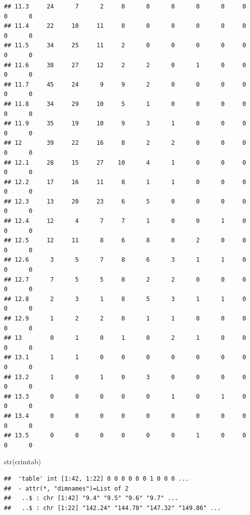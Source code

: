 \documentclass[
]{article}
\newenvironment{Shaded}{\begin{snugshade}}{\end{snugshade}}
\newcommand{\FunctionTok}[1]{\textcolor[rgb]{0.00,0.00,0.00}{#1}}
\newcommand{\NormalTok}[1]{#1}
\begin{document}
\begin{verbatim}
## 11.3     24      7      2     0      0      0      0      0     0      0      0
## 11.4     22     10     11     0      0      0      0      0     0      0      0
## 11.5     34     25     11     2      0      0      0      0     0      0      0
## 11.6     38     27     12     2      2      0      1      0     0      0      0
## 11.7     45     24      9     9      2      0      0      0     0      0      0
## 11.8     34     29     10     5      1      0      0      0     0      0      0
## 11.9     35     19     10     9      3      1      0      0     0      0      0
## 12       39     22     16     8      2      2      0      0     0      0      0
## 12.1     28     15     27    10      4      1      0      0     0      0      0
## 12.2     17     16     11     8      1      1      0      0     0      0      0
## 12.3     13     20     23     6      5      0      0      0     0      0      0
## 12.4     12      4      7     7      1      0      0      1     0      0      0
## 12.5     12     11      8     6      8      0      2      0     0      0      0
## 12.6      3      5      7     8      6      3      1      1     0      0      0
## 12.7      7      5      5     8      2      2      0      0     0      0      0
## 12.8      2      3      1     8      5      3      1      1     0      0      0
## 12.9      1      2      2     0      1      1      0      0     0      0      0
## 13        0      1      0     1      0      2      1      0     0      0      0
## 13.1      1      1      0     0      0      0      0      0     0      0      0
## 13.2      1      0      1     0      3      0      0      0     0      0      0
## 13.3      0      0      0     0      0      1      0      1     0      0      0
## 13.4      0      0      0     0      0      0      0      0     0      0      0
## 13.5      0      0      0     0      0      0      1      0     0      0      0
\end{verbatim}

\begin{Shaded}
\begin{Highlighting}[]
\FunctionTok{str}\NormalTok{(crimtab)}
\end{Highlighting}
\end{Shaded}

\begin{verbatim}
##  'table' int [1:42, 1:22] 0 0 0 0 0 0 1 0 0 0 ...
##  - attr(*, "dimnames")=List of 2
##   ..$ : chr [1:42] "9.4" "9.5" "9.6" "9.7" ...
##   ..$ : chr [1:22] "142.24" "144.78" "147.32" "149.86" ...
\end{verbatim}
\end{document}
